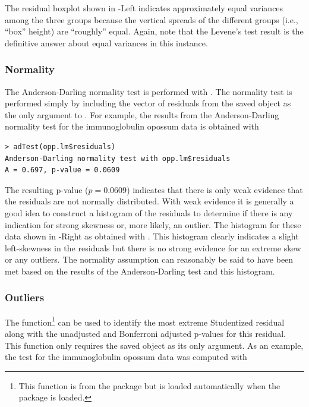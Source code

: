 \documentclass[10pt,openany]{book}\usepackage[]{graphicx}\usepackage[]{color}
\makeatletter
\newenvironment{kframe}{%
 \def\at@end@of@kframe{}%
 \ifinner\ifhmode%
  \def\at@end@of@kframe{\end{minipage}}%
  \begin{minipage}{\columnwidth}%
 \fi\fi%
 \def\FrameCommand##1{\hskip\@totalleftmargin \hskip-\fboxsep
 \colorbox{shadecolor}{##1}\hskip-\fboxsep
     \hskip-\linewidth \hskip-\@totalleftmargin \hskip\columnwidth}%
 \MakeFramed {\advance\hsize-\width
   \@totalleftmargin\z@ \linewidth\hsize
   \@setminipage}}%
 {\par\unskip\endMakeFramed%
 \at@end@of@kframe}
\newenvironment{knitrout}{}{} %
\makeatother
\begin{document}
The residual boxplot shown in -Left indicates approximately equal variances among the three groups because the vertical spreads of the different groups (i.e., ``box'' height) are ``roughly'' equal.  Again, note that the Levene's test result is the definitive answer about equal variances in this instance.

\subsubsection*{Normality}
The Anderson-Darling normality test is performed with .  The normality test is performed simply by including the vector of residuals from the saved  object as the only argument to .  For example, the results from the Anderson-Darling normality test for the immunoglobulin opossum data is obtained with

\begin{knitrout}
\color{fgcolor}\begin{kframe}
\begin{verbatim}
> adTest(opp.lm$residuals)
Anderson-Darling normality test with opp.lm$residuals 
A = 0.697, p-value = 0.0609
\end{verbatim}
\end{kframe}
\end{knitrout}

The resulting p-value ($p=0.0609$) indicates that there is only weak evidence that the residuals are not normally distributed.  With weak evidence it is generally a good idea to construct a histogram of the residuals to determine if there is any indication for strong skewness or, more likely, an outlier.  The histogram for these data shown in -Right as obtained with .  This histogram clearly indicates a slight left-skewness in the residuals but there is no strong evidence for an extreme skew or any outliers.  The normality assumption can reasonably be said to have been met based on the results of the Anderson-Darling test and this histogram.

\subsubsection*{Outliers}
The  function\footnote{This function is from the  package but is loaded automatically when the  package is loaded.} can be used to identify the most extreme Studentized residual along with the unadjusted and Bonferroni adjusted p-values for this residual.  This function only requires the saved  object as its only argument.  As an example, the test for the immunoglobulin opossum data was computed with
\end{document}
